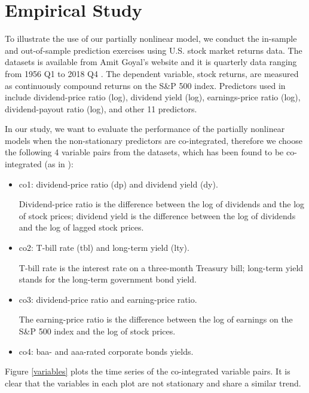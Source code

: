 \documentclass[a4paper,12pt,times,numbered,print,index]{report}
\numberwithin{equation}{section}
\begin{document}
	\section{Empirical Study}
	To illustrate the use of our partially nonlinear model, we conduct the in-sample and out-of-sample prediction exercises using U.S. stock market returns data.
	The datasets is available from Amit Goyal's website and it is quarterly data ranging from 1956 Q1 to 2018 Q4 . 
	The dependent variable, stock returns, are measured as continuously compound returns on the S\&P 500 index. 
	Predictors used in \cite{welch2008comprehensive} include dividend-price ratio (log), dividend yield (log), earnings-price ratio (log), dividend-payout ratio (log), and other 11 predictors. 
	
	In our study, we want to evaluate the performance of the partially nonlinear models when the non-stationary predictors are co-integrated, therefore we choose the following 4 variable pairs from the \cite{welch2008comprehensive} datasets, which has been found to be co-integrated (as in \cite{zhou2018semiparametric}): 
	\begin{itemize}
		\item co1: dividend-price ratio (dp) and dividend yield (dy). 
		
		Dividend-price ratio is the difference between the log of dividends and the log of stock prices; dividend yield is the difference between the log of dividends and the log of lagged stock prices.
		
		\item co2: T-bill rate (tbl) and long-term yield (lty).
		
		T-bill rate is the interest rate on a three-month Treasury bill; long-term yield stands for the long-term government bond yield.
		
		\item co3: dividend-price ratio and earning-price ratio.
		
		The earning-price ratio is the difference between the log of earnings on the S\&P 500 index and the log of stock prices.
		
		\item co4: baa- and aaa-rated corporate bonds yields. 
	\end{itemize}
	
	Figure \ref{variables} plots the time series of the co-integrated variable pairs. It is clear that the variables in each plot are not stationary and share a similar trend.
	
\end{document}
